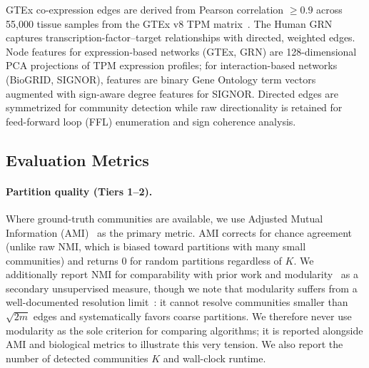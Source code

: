 \documentclass[11pt]{article}
\begin{document}
GTEx co-expression edges are derived from Pearson correlation $\geq 0.9$ across 55{,}000 tissue samples from the GTEx v8 TPM matrix~\citep{gtex_2020}.
The Human GRN captures transcription-factor--target relationships with directed, weighted edges.
Node features for expression-based networks (GTEx, GRN) are 128-dimensional PCA projections of TPM expression profiles; for interaction-based networks (BioGRID, SIGNOR), features are binary Gene Ontology term vectors augmented with sign-aware degree features for SIGNOR.
Directed edges are symmetrized for community detection while raw directionality is retained for feed-forward loop (FFL) enumeration and sign coherence analysis.


\subsection{Evaluation Metrics}
\label{sec:metrics}

\paragraph{Partition quality (Tiers 1--2).}
Where ground-truth communities are available, we use Adjusted Mutual Information (AMI)~\citep{vinh_ami_2010} as the primary metric.
AMI corrects for chance agreement (unlike raw NMI, which is biased toward partitions with many small communities) and returns 0 for random partitions regardless of $K$.
We additionally report NMI for comparability with prior work and modularity~\citep{m__e__j__newman_cfc12888} as a secondary unsupervised measure, though we note that modularity suffers from a well-documented resolution limit~\citep{santo_fortunato_d0b5bf4d}: it cannot resolve communities smaller than $\sqrt{2m}$ edges and systematically favors coarse partitions.
We therefore never use modularity as the sole criterion for comparing algorithms; it is reported alongside AMI and biological metrics to illustrate this very tension.
We also report the number of detected communities $K$ and wall-clock runtime.
\end{document}
